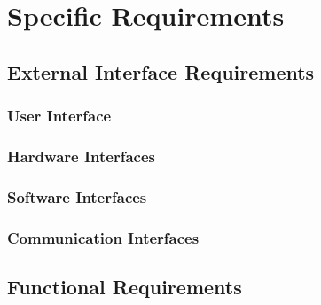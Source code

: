 \section{Specific Requirements} \label{sec:spec_requirements}


\subsection{External Interface Requirements} \label{external}

\subsubsection{User Interface} \label{user_interface}

\subsubsection{Hardware Interfaces} \label{hw_interfaces}

\subsubsection{Software Interfaces} \label{sw_interfaces}

\subsubsection{Communication Interfaces} \label{comm_interfaces}

\subsection{Functional Requirements} \label{sec:funct_requirements}



